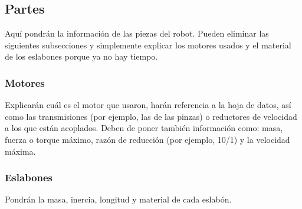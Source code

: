 \subsection{Partes} \label{subsec:partes}
Aquí pondrán la información de las piezas del robot. Pueden eliminar las siguientes subsecciones y simplemente explicar los motores usados y el material de los eslabones porque ya no hay tiempo.
\subsubsection{Motores} \label{subsubsec:motores}
Explicarán cuál es el motor que usaron, harán referencia a la hoja de datos, así como las transmisiones (por ejemplo, las de las pinzas) o reductores de velocidad a los que están acoplados. Deben de poner también información como: masa, fuerza o torque máximo, razón de reducción (por ejemplo, 10/1) y la velocidad máxima.
\subsubsection{Eslabones} \label{subsubsec:eslabones}
Pondrán la masa, inercia, longitud y material de cada eslabón.